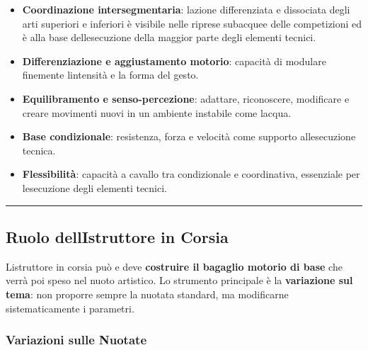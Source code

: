 \documentclass[a4paper,11pt]{article}
\providecommand{\tightlist}{%
  \setlength{\itemsep}{0pt}\setlength{\parskip}{0pt}}
\begin{document}
\begin{itemize}
      \tightlist
      \item
            \textbf{Coordinazione intersegmentaria}: l\textquotesingle azione
            differenziata e dissociata degli arti superiori e inferiori è visibile
            nelle riprese subacquee delle competizioni ed è alla base
            dell\textquotesingle esecuzione della maggior parte degli elementi
            tecnici.
      \item
            \textbf{Differenziazione e aggiustamento motorio}: capacità di
            modulare finemente l\textquotesingle intensità e la forma del gesto.
      \item
            \textbf{Equilibramento e senso-percezione}: adattare, riconoscere,
            modificare e creare movimenti nuovi in un ambiente instabile come
            l\textquotesingle acqua.
      \item
            \textbf{Base condizionale}: resistenza, forza e velocità come supporto
            all\textquotesingle esecuzione tecnica.
      \item
            \textbf{Flessibilità}: capacità a cavallo tra condizionale e
            coordinativa, essenziale per l\textquotesingle esecuzione degli
            elementi tecnici.
\end{itemize}

\begin{center}\rule{0.5\linewidth}{0.5pt}\end{center}

\subsection{Ruolo dell\textquotesingle Istruttore in
      Corsia}\label{ruolo-dellistruttore-in-corsia}

L\textquotesingle istruttore in corsia può e deve \textbf{costruire il
      bagaglio motorio di base} che verrà poi speso nel nuoto artistico. Lo
strumento principale è la \textbf{variazione sul tema}: non proporre
sempre la nuotata standard, ma modificarne sistematicamente i parametri.

\subsubsection{Variazioni sulle Nuotate}\label{variazioni-sulle-nuotate}
\end{document}
